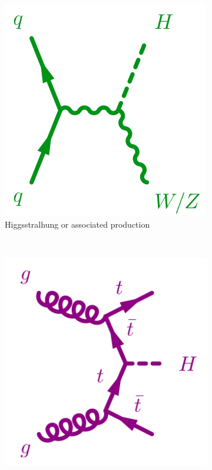 \begin{figure}
        \begin{subfigure}[b]{0.3\textwidth}
                \includegraphics[width=\textwidth]{1_Introduction_Th_and_Exp/pics/Higgsstralhung.png}
                \caption{Higgsstralhung or associated production}
                \label{fig:vh}
        \end{subfigure}
        ~ 
        \begin{subfigure}[b]{0.3\textwidth}
                \includegraphics[width=\textwidth]{1_Introduction_Th_and_Exp/pics/ttFusion.png}

\end{subfigure}
\end{figure}
